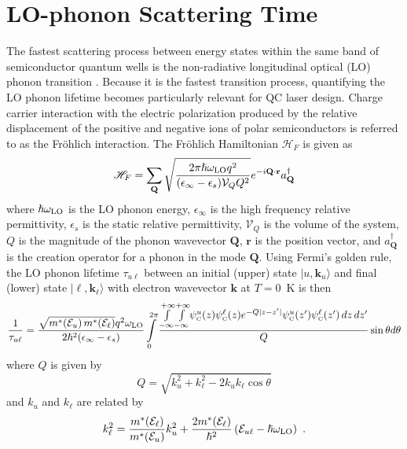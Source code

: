 \documentclass[12pt]{report}
\begin{document}
\section{LO-phonon Scattering Time}
The fastest scattering process between energy states within the same band of semiconductor quantum wells is the non-radiative longitudinal optical (LO) phonon transition \cite{Ferreira:PRB:1989}.  Because it is the fastest transition process, quantifying the LO phonon lifetime becomes particularly relevant for QC laser design.  Charge carrier interaction with the electric polarization produced by the relative displacement of the positive and negative ions of polar semiconductors is referred to as the Fr\"{o}hlich interaction.  The Fr\"{o}hlich Hamiltonian $\mathscr{H}_F$ is given as
\begin{equation}
\mathscr{H}_F = \sum_{\mathbf{Q}} \sqrt{\frac{2 \pi \hslash\omega_{\textnormal{LO}} q^2}{(\epsilon_\infty - \epsilon_s) \mathcal{V}_Q Q^2}} e^{-i \mathbf{Q}\cdot\mathbf{r}} a_\mathbf{Q}^\dag
\end{equation}
where $\hslash\omega_{\textnormal{LO}}$ is the LO phonon energy, $\epsilon_\infty$ is the high frequency relative permittivity, $\epsilon_s$ is the static relative permittivity, $\mathcal{V}_Q$ is the volume of the system, $Q$ is the magnitude of the phonon wavevector $\mathbf{Q}$, $\mathbf{r}$ is the position vector, and $a_\mathbf{Q}^\dag$ is the creation operator for a phonon in the mode $\mathbf{Q}$.  Using Fermi's golden rule, the LO phonon lifetime $\tau_{u\ell}$ between an initial (upper) state $|u,\mathbf{k}_u\rangle$ and final (lower) state $|\ell,\mathbf{k}_\ell\rangle$ with electron wavevector $\mathbf{k}$ at $T=0$~K is then
\begin{equation}
\label{chpt1eqn:tau_complicated}
\frac{1}{\tau_{u\ell}} = \frac{\sqrt{m^*\!\left(\EE_u\right) m^*\!\left(\EE_\ell\right)} q^2 \omega_{\tn{LO}}}{2 \hslash^2 (\epsilon_\infty - \epsilon_s)} \int\limits_0^{2 \pi} \frac{\int\limits_{-\infty}^{+\infty} \! \int\limits_{-\infty}^{+\infty} \! \psi_\tn{\tiny{C}}^u(z) \psi_\tn{\tiny{C}}^\ell (z) e^{-Q|z-z'|} \psi_\tn{\tiny{C}}^u(z') \psi_\tn{\tiny{C}}^\ell (z') \, dz \, dz'}{Q} \sin\theta d\theta
\end{equation}
where $Q$ is given by
\begin{equation}
Q=\sqrt{k_u^2+k_\ell^2-2 k_u k_\ell \cos\theta}
\end{equation}
and $k_u$ and $k_\ell$ are related by
\begin{equation}
k_\ell^2 = \frac{m^*\!\left(\EE_\ell\right)}{m^*\!\left(\EE_u\right)} k_u^2 + \frac{2 m^*\!\left(\EE_\ell\right)}{\hslash^2} \left(\EE_{u\ell}-\hslash\omega_{\tn{LO}}\right) \tn{~.}
\end{equation}
\end{document}
